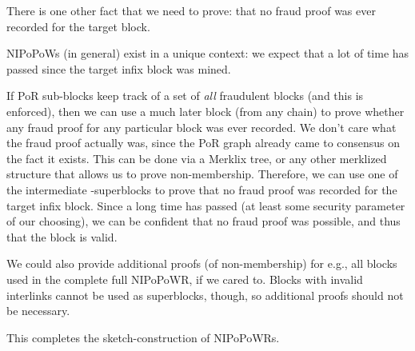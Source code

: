 There is one other fact that we need to prove: that no fraud proof was ever recorded for the target block.



NIPoPoWs (in general) exist in a unique context: we expect that a lot of time has passed since the target infix block was mined.

If PoR sub-blocks keep track of a set of \emph{all} fraudulent blocks (and this is enforced), then we can use a much later block (from any chain) to prove whether any fraud proof for any particular block was ever recorded.
We don't care what the fraud proof actually was, since the PoR graph already came to consensus on the fact it exists.
This can be done via a Merklix tree, or any other merklized structure that allows us to prove non-membership.
Therefore, we can use one of the intermediate \mu-superblocks to prove that no fraud proof was recorded for the target infix block.
Since a long time has passed (at least some security parameter of our choosing), we can be confident that no fraud proof was possible, and thus that the block is valid.

We could also provide additional proofs (of non-membership) for e.g., all blocks used in the complete full NIPoPoWR, if we cared to.
Blocks with invalid interlinks cannot be used as superblocks, though, so additional proofs should not be necessary.

This completes the sketch-construction of NIPoPoWRs.
